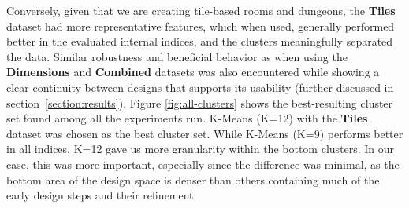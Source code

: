 
Conversely, given that we are creating tile-based rooms and dungeons, the \textbf{Tiles} dataset had more representative features, which when used, generally performed better in the evaluated internal indices, and the clusters meaningfully separated the data. Similar robustness and beneficial behavior as when using the \textbf{Dimensions} and \textbf{Combined} datasets was also encountered while showing a clear continuity between designs that supports its usability (further discussed in section~\ref{section:results}). Figure \ref{fig:all-clusters} shows the best-resulting cluster set found among all the experiments run. K-Means (K=12) with the \textbf{Tiles} dataset was chosen as the best cluster set. While K-Means (K=9) performs better in all indices, K=12 gave us more granularity within the bottom clusters. In our case, this was more important, especially since the difference was minimal, as the bottom area of the design space is denser than others containing much of the early design steps and their refinement.






